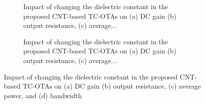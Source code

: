 
\begin{figure}[htbp]
  \centering
  \begin{subfigure}[b]{0.48\linewidth}
    \centering
    \caption{Impact of changing the dielectric constant in the proposed CNT-based TC-OTAs on (a) DC gain (b) output resistance, (c) average...}

  \end{subfigure}
  \hfill
  \begin{subfigure}[b]{0.48\linewidth}
    \centering
    \caption{Impact of changing the dielectric constant in the proposed CNT-based TC-OTAs on (a) DC gain (b) output resistance, (c) average...}

  \end{subfigure}
  \caption{Impact of changing the dielectric constant in the proposed CNT-based TC-OTAs on (a) DC gain (b) output resistance, (c) average power, and (d) bandwidth}

  \label{fig:group_m4kt3}
\end{figure}
